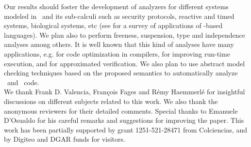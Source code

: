 \documentclass{tlp}
\begin{document}
Our results should foster the development of analyzers 
for different  systems modeled in \utcc\ and its sub-calculi such as security protocols, reactive and timed systems, biological systems, etc (see \cite{DBLP:journals/constraints/OlarteRV13} for a survey of applications of \ccp-based languages).  
We plan also to perform  freeness, suspension, 
type  and  independence analyses among others. It is well known that this 
kind of analyses  have many applications, e.g. for code optimization in compilers, for improving run-time 
execution, and for approximated verification. We also plan to use abstract model checking techniques based on the proposed semantics to automatically analyze \utcc\ and \tccp\ code. 
\\

We thank Frank D. Valencia, Fran\c cois Fages and R\'emy Haemmerl\'e for insightful discussions on different   subjects related to this work. We also thank   the anonymous reviewers for their detailed comments.
Special thanks to Emanuele D'Osualdo for his careful remarks and suggestions for improving the paper.  This work has been partially supported by grant 1251-521-28471 from Colciencias, and by Digiteo and  DGAR funds for visitors.
\end{document}
